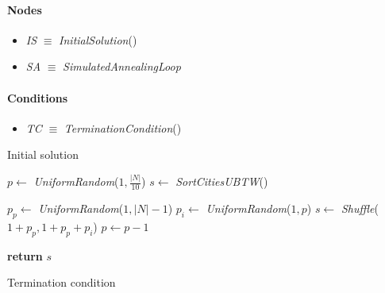 \begin{homeworkProblem}
\begin{center}
\begin{minipage}{.45\textwidth}
\paragraph{Nodes}
\begin{itemize}
  \item \emph{IS} $\equiv$ \emph{InitialSolution}()
  \item \emph{SA} $\equiv$ \emph{SimulatedAnnealingLoop}
\end{itemize}
\paragraph{Conditions}
\begin{itemize}
  \item \emph{TC} $\equiv$ \emph{TerminationCondition}()
\end{itemize}
\end{minipage}
\end{center}



\begin{algorithm}
\caption{Initial solution}
\label{SA:Init}
\begin{algorithmic}

\State $p \gets$ \emph{UniformRandom}($1,\frac{|N|}{10}$) 
\State $s \gets$ \emph{SortCitiesUBTW}() 	

  \State $p_p \gets$ \emph{UniformRandom}($1,|N|-1$) 
  \State $p_i \gets$ \emph{UniformRandom}($1,p$) 
  \State $s \gets$ \emph{Shuffle}($1+p_p,1+p_p+p_i$) 
  \State $p \gets p-1$
\EndWhile	

\State \textbf{return} $s$

\EndProcedure    
\end{algorithmic}
\end{algorithm}

\begin{algorithm}
\caption{Termination condition}
\label{SA:Term}
\begin{algorithmic}
\EndProcedure
\end{algorithmic}
\end{algorithm}


\end{homeworkProblem}
